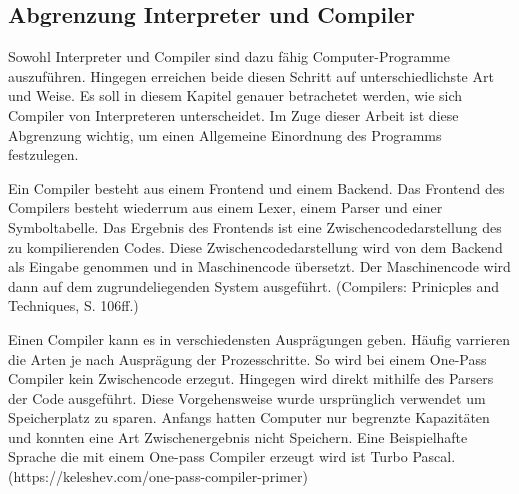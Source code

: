 %
	
 
    \pagebreak
	\subsection{Abgrenzung Interpreter und Compiler}
  Sowohl Interpreter und Compiler sind dazu fähig Computer-Programme auszuführen. Hingegen erreichen beide diesen Schritt auf unterschiedlichste Art und Weise. Es soll in diesem Kapitel genauer betrachetet werden, wie sich Compiler von Interpreteren unterscheidet. Im Zuge dieser Arbeit ist diese Abgrenzung wichtig, um einen Allgemeine Einordnung des Programms festzulegen.
  
  Ein Compiler besteht aus einem Frontend und einem Backend. Das Frontend des Compilers besteht wiederrum aus einem Lexer, einem Parser und einer Symboltabelle. Das Ergebnis des Frontends ist eine Zwischencodedarstellung des zu kompilierenden Codes. Diese Zwischencodedarstellung wird von dem Backend als Eingabe genommen und in Maschinencode übersetzt. Der Maschinencode wird dann auf dem zugrundeliegenden System ausgeführt. (Compilers: Prinicples and Techniques, S. 106ff.)
  
  Einen Compiler kann es in verschiedensten Ausprägungen geben. Häufig varrieren die Arten je nach Ausprägung der Prozesschritte. 
So wird bei einem One-Pass Compiler kein Zwischencode erzegut. Hingegen wird direkt mithilfe des Parsers der Code ausgeführt. Diese Vorgehensweise wurde ursprünglich verwendet um Speicherplatz zu sparen. Anfangs hatten Computer nur begrenzte Kapazitäten und konnten eine Art Zwischenergebnis nicht Speichern. Eine Beispielhafte Sprache die mit einem One-pass Compiler erzeugt wird ist Turbo Pascal. (https://keleshev.com/one-pass-compiler-primer)

